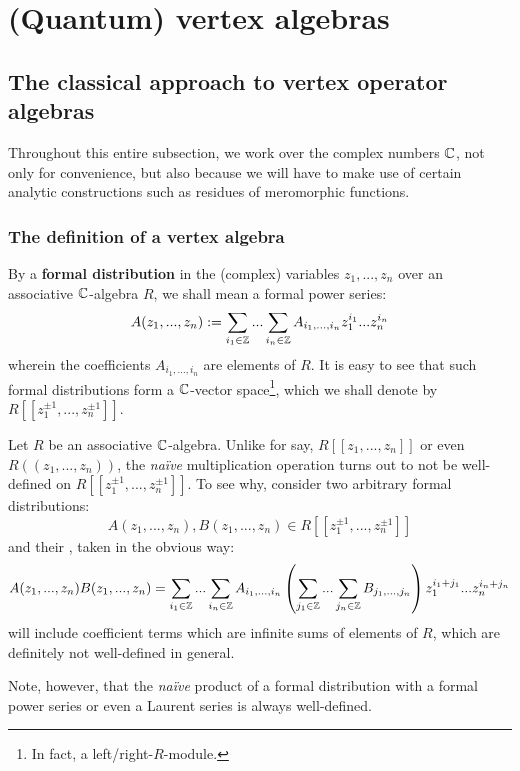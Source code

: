 \section{(Quantum) vertex algebras}
    \subsection{The classical approach to vertex operator algebras}
        \begin{convention}
            Throughout this entire subsection, we work over the complex numbers $\mathbb{C}$, not only for convenience, but also because we will have to make use of certain analytic constructions such as residues of meromorphic functions.
        \end{convention}
    
        \subsubsection{The definition of a vertex algebra}
            \begin{definition} \label{def: formal_distributions}
                By a \textbf{formal distribution} in the (complex) variables $z_1, ..., z_n$ over an associative $\mathbb{C}$-algebra $R$, we shall mean a formal power series:
                    $$A(z_1, ..., z_n) := \sum_{i_1 \in \mathbb{Z}} ... \sum_{i_n \in \mathbb{Z}} A_{i_1, ..., i_n} z_1^{i_1} ... z_n^{i_n}$$
                wherein the coefficients $A_{i_1, ..., i_n}$ are elements of $R$. It is easy to see that such formal distributions form a $\mathbb{C}$-vector space\footnote{In fact, a left/right-$R$-module.}, which we shall denote by $R[\![z_1^{\pm 1}, ..., z_n^{\pm 1}]\!]$.  
            \end{definition}
            \begin{remark} \label{remark: multiplying_formal_distributions}
                Let $R$ be an associative $\mathbb{C}$-algebra. Unlike for say, $R[\![z_1, ..., z_n]\!]$ or even $R(\!(z_1, ..., z_n)\!)$, the \textit{na\"ive} multiplication operation turns out to not be well-defined on $R[\![z_1^{\pm 1}, ..., z_n^{\pm 1}]\!]$. To see why, consider two arbitrary formal distributions:
                    $$A(z_1, ..., z_n), B(z_1, ..., z_n) \in R[\![z_1^{\pm 1}, ..., z_n^{\pm 1}]\!]$$
                and their , taken in the obvious way:
                    $$A(z_1, ..., z_n) B(z_1, ..., z_n) = \sum_{i_1 \in \mathbb{Z}} ... \sum_{i_n \in \mathbb{Z}} A_{i_1, ..., i_n} \left(\sum_{j_1 \in \mathbb{Z}} ... \sum_{j_n \in \mathbb{Z}} B_{j_1, ..., j_n}\right) z_1^{i_1 + j_1} ... z_n^{i_n + j_n}$$
                will include coefficient terms which are infinite sums of elements of $R$, which are definitely not well-defined in general. 
                
                Note, however, that the \textit{na\"ive} product of a formal distribution with a formal power series or even a Laurent series is always well-defined. 
            \end{remark}
            
